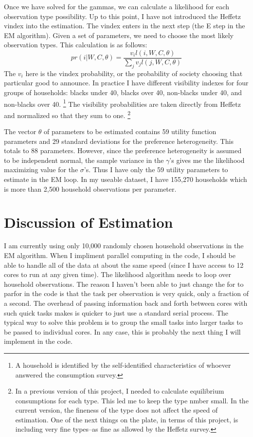 \documentclass{article}
\begin{document}
Once we have solved for the gammas, we can calculate a likelihood for each observation type possibility.
Up to this point, I have not introduced the Heffetz vindex into the estimation. The vindex enters in the next step (the E step in the EM algorithm).
Given a set of parameters, we need to choose the most likely observation types.
This calculation is as follows:
\begin{equation}
	pr(i|W,C,\theta) = \frac{v_i l(i,W,C,\theta)}{\sum_j v_j l(j,W,C,\theta)}
\end{equation}
The $v_i$ here is the vindex probability, or the probability of society choosing that particular good to announce.
In practice I have different visibility indexes for four groups of households: blacks under 40, blacks over 40, non-blacks under 40, and non-blacks over 40.
\footnote{A household is identified by the self-identified characteristics of whoever answered the consumption survey.} 
The visibility probabilities are taken directly from Heffetz and normalized so that they sum to one.
\footnote{In a previous version of this project, I needed to calculate equilibrium consumptions for each type.  This led me to keep the type nmber small.  In the current version, the fineness of the type does not affect the speed of estimation.  One of the next things on the plate, in terms of this project, is including very fine types--as fine as allowed by the Heffetz survey.}

The vector $\theta$ of parameters to be estimated contains 59 utility function parameters and 29 standard deviations for the preference heterogeneity.  
This totals to 88 parameters.  
However, since the preference heterogeneity is assumed to be independent normal, the sample variance in the $\gamma$'s gives me the likelihood maximizing value for the $\sigma$'s.
Thus I have only the 59 utility parameters to estimate in the EM loop. 
In my useable dataset, I have 155,270 households which is more than 2,500 household observations per parameter.
\section{Discussion of Estimation}
I am currently using only 10,000 randomly chosen household observations in the EM algorithm.
When I impliment parallel computing in the code, I should be able to handle all of the data at about the same speed (since I have access to 12 cores to run at any given time).
The likelihood algorithm needs to loop over household observations.
The reason I haven't been able to just change the for to parfor in the code is that the task per observation is very quick, only a fraction of a second.
The overhead of passing information back and forth between cores with such quick tasks makes is quicker to just use a standard serial process.
The typical way to solve this problem is to group the small tasks into larger tasks to be passed to individual cores.  
In any case, this is probably the next thing I will implement in the code.
\end{document}

